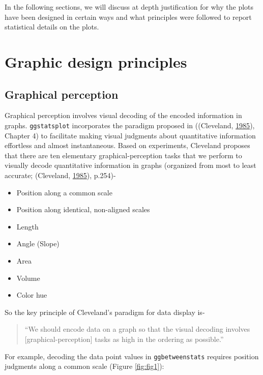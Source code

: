 \documentclass[
]{article}
\providecommand{\tightlist}{%
  \setlength{\itemsep}{0pt}\setlength{\parskip}{0pt}}
\begin{document}
In the following sections, we will discuss at depth justification for why the
plots have been designed in certain ways and what principles were followed to
report statistical details on the plots.

\hypertarget{graphic-design-principles}{%
\section{Graphic design principles}\label{graphic-design-principles}}

\hypertarget{graphical-perception}{%
\subsection{Graphical perception}\label{graphical-perception}}

Graphical perception involves visual decoding of the encoded information in
graphs. \texttt{ggstatsplot} incorporates the paradigm proposed in
((Cleveland, \protect\hyperlink{ref-clevelandElementsGraphingData1985}{1985}), Chapter 4) to facilitate making visual
judgments about quantitative information effortless and almost instantaneous.
Based on experiments, Cleveland proposes that there are ten elementary
graphical-perception tasks that we perform to visually decode quantitative
information in graphs (organized from most to least accurate;
(Cleveland, \protect\hyperlink{ref-clevelandElementsGraphingData1985}{1985}), p.254)-

\begin{itemize}
\tightlist
\item
  Position along a common scale
\item
  Position along identical, non-aligned scales
\item
  Length
\item
  Angle (Slope)
\item
  Area
\item
  Volume
\item
  Color hue
\end{itemize}

So the key principle of Cleveland's paradigm for data display is-

\begin{quote}
``We should encode data on a graph so that the visual decoding involves
{[}graphical-perception{]} tasks as high in the ordering as possible.''
\end{quote}

For example, decoding the data point values in \texttt{ggbetweenstats} requires
position judgments along a common scale (Figure \ref{fig:fig1}):
\end{document}
